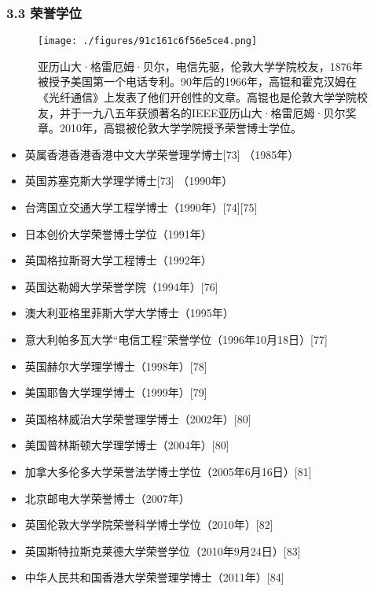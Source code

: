 \subsubsection{3.3 荣誉学位}
\begin{figure}[ht]
\centering
\texttt{[image: ./figures/91c161c6f56e5ce4.png]}
\caption{亚历山大·格雷厄姆·贝尔，电信先驱，伦敦大学学院校友，1876年被授予美国第一个电话专利。90年后的1966年，高锟和霍克汉姆在《光纤通信》上发表了他们开创性的文章。高锟也是伦敦大学学院校友，并于一九八五年获颁著名的IEEE亚历山大·格雷厄姆·贝尔奖章。2010年，高锟被伦敦大学学院授予荣誉博士学位。} \label{fig_GK_2}
\end{figure}
\begin{itemize}
\item 英属香港香港香港中文大学荣誉理学博士[73] （1985年）
\item 英国苏塞克斯大学理学博士[73] （1990年）
\item 台湾国立交通大学工程学博士（1990年）[74][75]
\item 日本创价大学荣誉博士学位（1991年）
\item 英国格拉斯哥大学工程博士（1992年）
\item 英国达勒姆大学荣誉学院（1994年）[76]
\item 澳大利亚格里菲斯大学大学博士（1995年）
\item 意大利帕多瓦大学“电信工程”荣誉学位（1996年10月18日）[77]
\item 英国赫尔大学理学博士（1998年）[78]
\item 美国耶鲁大学理学博士（1999年）[79]
\item 英国格林威治大学荣誉理学博士（2002年）[80]
\item 美国普林斯顿大学理学博士（2004年）[80]
\item 加拿大多伦多大学荣誉法学博士学位（2005年6月16日）[81]
\item 北京邮电大学荣誉博士（2007年）
\item 英国伦敦大学学院荣誉科学博士学位（2010年）[82]
\item 英国斯特拉斯克莱德大学荣誉学位（2010年9月24日）[83]
\item 中华人民共和国香港大学荣誉理学博士（2011年）[84]
\end{itemize}

